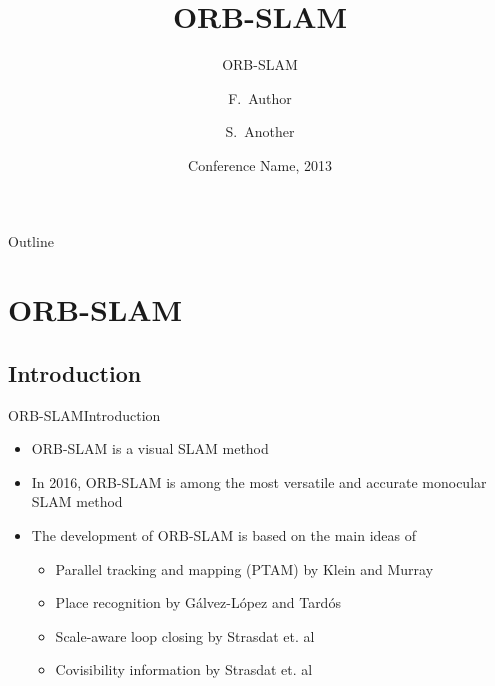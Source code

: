 \documentclass{beamer}
\title{ORB-SLAM}
\subtitle{ORB-SLAM}
\author{F.~Author\inst{1} \and S.~Another\inst{2}}
\institute[AIT] %
{
  \inst{1}%
  Department of Computer Science\\
  University of Somewhere
  \and
  \inst{2}%
  Department of Theoretical Philosophy\\
  University of Elsewhere}
\date{Conference Name, 2013}
\begin{document}
\begin{frame}
  \titlepage
\end{frame}

\begin{frame}{Outline}
  \tableofcontents
\end{frame}

\section{ORB-SLAM}

\subsection{Introduction}

\begin{frame}{ORB-SLAM}{Introduction}
  \begin{itemize}
  \item {
    ORB-SLAM is a visual SLAM method
  }
  \item{
  In 2016, ORB-SLAM is among the most versatile and accurate monocular SLAM method
  }
  \item {
    The development of ORB-SLAM is based on the main ideas of 
    \begin{itemize}
        \item {
        Parallel tracking and mapping (PTAM) by Klein and Murray 
        }
        \item{
        Place recognition by G{\'a}lvez-L{\'o}pez and Tard{\'o}s 
        }
        \item{
        Scale-aware loop closing by Strasdat et. al 
        }
        \item{
        Covisibility information by Strasdat et. al
        }
    \end{itemize}
    }
  \end{itemize}
\end{frame}
\end{document}
